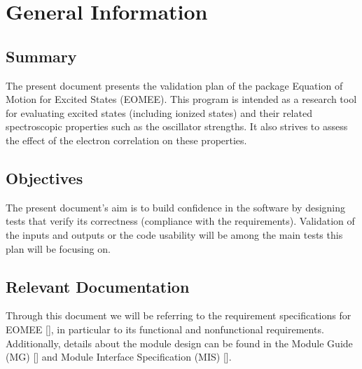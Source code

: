 \documentclass[12pt, titlepage]{article}
\begin{document}
\section{General Information}
\label{section:geninfo}

\subsection{Summary}

The present document presents the validation plan of the package Equation of 
Motion for Excited States (EOMEE). This program is intended as a research tool 
for evaluating excited states (including ionized states) and their related 
spectroscopic properties such as the oscillator strengths. It also strives to 
assess the effect of the electron correlation on these properties.

\subsection{Objectives}

The present document's aim is to build confidence in the software by designing 
tests that verify its correctness (compliance with the requirements). 
Validation of the inputs and outputs or the 
code usability will be among the main tests this plan will be focusing on.

\subsection{Relevant Documentation}


Through this document we will be referring to the requirement specifications 
for EOMEE [\citet{SRS2020}], in particular to its functional and nonfunctional 
requirements. Additionally, details about the module design can be found in the 
Module Guide (MG) [\cite{MG2020}] and Module Interface Specification (MIS) 
[\cite{MIS2020}].
\end{document}
